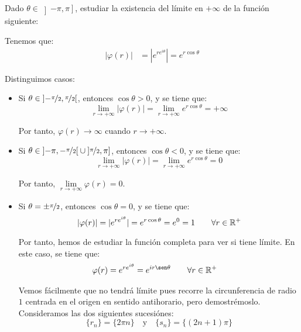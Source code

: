 \begin{ejercicio}
    Dado $\theta\in \left] -\pi, \pi \right]$, estudiar la existencia del límite en $+\infty$ de la función siguiente:

    Tenemos que:
    \begin{align*}
        |\varphi(r)| &= |e^{re^{i\theta}}| = e^{r\cos\theta}
    \end{align*}

    Distinguimos casos:
    \begin{itemize}
        \item Si $\theta\in \left] -\nicefrac{\pi}{2}, \nicefrac{\pi}{2} \right[$, entonces $\cos\theta > 0$, y se tiene que:
        \begin{equation*}
            \lim_{r\to +\infty} |\varphi(r)| = \lim_{r\to +\infty} e^{r\cos\theta} = +\infty
        \end{equation*}

        Por tanto, $\varphi(r) \to \infty$ cuando $r\to +\infty$.

        \item Si $\theta \in \left]-\pi, -\nicefrac{\pi}{2} \right[ \cup \left]\nicefrac{\pi}{2}, \pi \right]$, entonces $\cos\theta < 0$, y se tiene que:
        \begin{equation*}
            \lim_{r\to +\infty} |\varphi(r)| = \lim_{r\to +\infty} e^{r\cos\theta} = 0
        \end{equation*}

        Por tanto, $\lim\limits_{r\to +\infty} \varphi(r) = 0$.

        \item Si $\theta = \pm \nicefrac{\pi}{2}$, entonces $\cos\theta = 0$, y se tiene que:
        \begin{equation*}
            |\varphi(r)| = |e^{re^{i\theta}}| = e^{r\cos\theta} = e^0 = 1\qquad \forall r\in \mathbb{R}^+
        \end{equation*}

        Por tanto, hemos de estudiar la función completa para ver si tiene límite. En este caso, se tiene que:
        \begin{align*}
            \varphi(r) &= e^{re^{i\theta}} = e^{ir\sen\theta}\qquad \forall r\in \bb{R}^+
        \end{align*}

        Vemos fácilmente que no tendrá límite pues recorre la circunferencia de radio $1$ centrada en el origen en sentido antihorario, pero demostrémoslo. Consideramos las dos siguientes sucesiónes:
        \begin{equation*}
            \{r_n\} = \{2\pi n\} \quad \text{y} \quad \{s_n\} = \{(2n+1)\pi\}
        \end{equation*}


\end{itemize}
\end{ejercicio}
